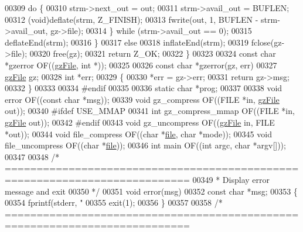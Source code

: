 \begin{DoxyCode}
{{{00309         \textcolor{keywordflow}{do} \{
00310             strm->next\_out = out;
00311             strm->avail\_out = BUFLEN;
00312             (void)deflate(strm, Z\_FINISH);
00313             fwrite(out, 1, BUFLEN - strm->avail\_out, gz->file);
00314         \} \textcolor{keywordflow}{while} (strm->avail\_out == 0);
00315         deflateEnd(strm);
00316     \}
00317     \textcolor{keywordflow}{else}
00318         inflateEnd(strm);
00319     fclose(gz->file);
00320     free(gz);
00321     \textcolor{keywordflow}{return} Z\_OK;
00322 \}
00323 
00324 \textcolor{keyword}{const} \textcolor{keywordtype}{char} *gzerror OF((\hyperlink{structgz_file__s}{gzFile}, \textcolor{keywordtype}{int} *));
00325 
00326 \textcolor{keyword}{const} \textcolor{keywordtype}{char} *gzerror(gz, err)
00327     \hyperlink{structgz_file__s}{gzFile} gz;
00328     \textcolor{keywordtype}{int} *err;
00329 \{
00330     *err = gz->err;
00331     \textcolor{keywordflow}{return} gz->msg;
00332 \}
00333 
00334 \textcolor{preprocessor}{#endif}
00335 
00336 \textcolor{keyword}{static} \textcolor{keywordtype}{char} *prog;
00337 
00338 \textcolor{keywordtype}{void} error            OF((\textcolor{keyword}{const} \textcolor{keywordtype}{char} *msg));
00339 \textcolor{keywordtype}{void} gz\_compress      OF((FILE   *in, \hyperlink{structgz_file__s}{gzFile} out));
00340 \textcolor{preprocessor}{#ifdef USE\_MMAP}
00341 \textcolor{keywordtype}{int}  gz\_compress\_mmap OF((FILE   *in, \hyperlink{structgz_file__s}{gzFile} out));
00342 \textcolor{preprocessor}{#endif}
00343 \textcolor{keywordtype}{void} gz\_uncompress    OF((\hyperlink{structgz_file__s}{gzFile} in, FILE   *out));
00344 \textcolor{keywordtype}{void} file\_compress    OF((\textcolor{keywordtype}{char}  *\hyperlink{structfile}{file}, \textcolor{keywordtype}{char} *mode));
00345 \textcolor{keywordtype}{void} file\_uncompress  OF((\textcolor{keywordtype}{char}  *\hyperlink{structfile}{file}));
00346 \textcolor{keywordtype}{int}  main             OF((\textcolor{keywordtype}{int} argc, \textcolor{keywordtype}{char} *argv[]));
00347 
00348 \textcolor{comment}{/* ===========================================================================}
00349 \textcolor{comment}{ * Display error message and exit}
00350 \textcolor{comment}{ */}
00351 \textcolor{keywordtype}{void} error(msg)
00352     \textcolor{keyword}{const} \textcolor{keywordtype}{char} *msg;
00353 \{
00354     fprintf(stderr, \textcolor{stringliteral}{"%
00355     exit(1);
00356 \}
00357 
00358 \textcolor{comment}{/* ===========================================================================}
}}}}
\end{DoxyCode}
